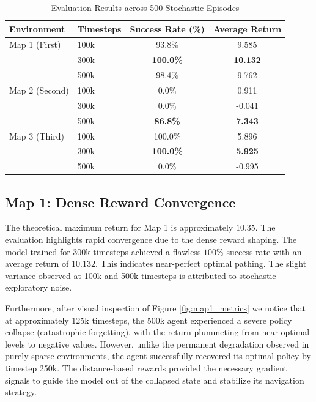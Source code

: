 \documentclass[12pt,a4paper]{article}
\begin{document}
\begin{table}[H]
    \centering
    \caption{Evaluation Results across 500 Stochastic Episodes}
    \label{tab:results}
    \begin{tabular}{llcc}
        \hline
        \textbf{Environment} & \textbf{Timesteps} & \textbf{Success Rate (\%)} & \textbf{Average Return} \\ \hline
        {Map 1 (First)}      & 100k               & 93.8\%                     & 9.585                   \\
                             & 300k               & \textbf{100.0\%}           & \textbf{10.132}         \\
                             & 500k               & 98.4\%                     & 9.762                   \\ \hline
        {Map 2 (Second)}     & 100k               & 0.0\%                      & 0.911                   \\
                             & 300k               & 0.0\%                      & -0.041                  \\
                             & 500k               & \textbf{86.8\%}            & \textbf{7.343}          \\ \hline
        {Map 3 (Third)}      & 100k               & 100.0\%                    & 5.896                   \\
                             & 300k               & \textbf{100.0\%}           & \textbf{5.925}          \\
                             & 500k               & 0.0\%                      & -0.995                  \\ \hline
    \end{tabular}
\end{table}

\subsection{Map 1: Dense Reward Convergence}
The theoretical maximum return for Map 1 is approximately $10.35$.
The evaluation highlights rapid convergence due to the dense reward shaping.
The model trained for 300k timesteps achieved a flawless $100\%$ success rate
with an average return of $10.132$. This indicates near-perfect optimal pathing.
The slight variance observed at 100k and 500k timesteps is attributed to
stochastic exploratory noise.

Furthermore, after visual inspection of Figure \ref{fig:map1_metrics}
we notice that at approximately 125k timesteps, the 500k agent experienced
a severe policy collapse (catastrophic forgetting),
with the return plummeting from near-optimal levels to negative values.
However, unlike the permanent degradation observed in purely sparse environments,
the agent successfully recovered its optimal policy by timestep 250k.
The distance-based rewards provided the necessary gradient signals
to guide the model out of the collapsed state and stabilize its navigation strategy.
\end{document}
